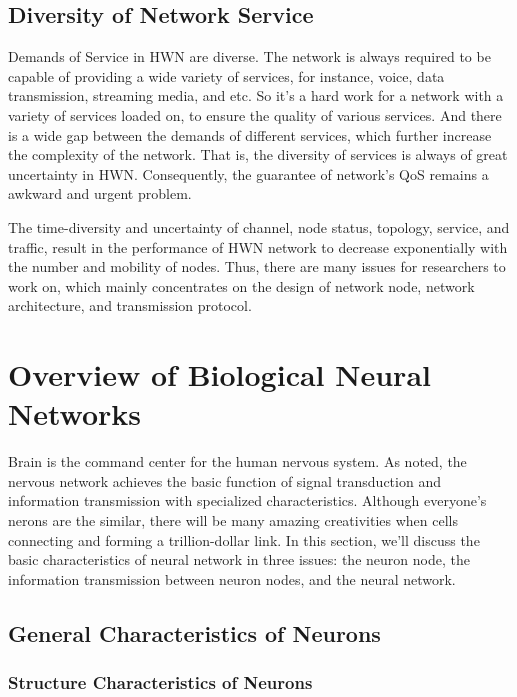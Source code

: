 \documentclass[journal,comsoc]{IEEEtran}
\begin{document}
			\subsection{Diversity of Network Service}
				Demands of Service in HWN are diverse. 
				The network is always required to be capable of providing a wide variety of services, for instance, voice, data transmission, streaming media, and etc.
				So it's a hard work for a network with a variety of services loaded on, to ensure the quality of various services.
				And there is a wide gap between the demands of different services, which further increase the complexity of the network.
				That is, the diversity of services is always of great uncertainty in HWN.
				Consequently, the guarantee of network's QoS remains a awkward and urgent problem.
				
				The time-diversity and uncertainty of channel, node status, topology, service, and traffic, 
				result in the performance of HWN network to decrease exponentially with the number and mobility of nodes.
				Thus, there are many issues for researchers to work on, 
				which mainly concentrates on the design of network node, network architecture, and transmission protocol.
		
	\section{Overview of Biological Neural Networks}
	\label{section: information_transmit}
		Brain is the command center for the human nervous system\cite{hart1983human}.
		As \cite{rsheng} noted, the nervous network achieves the basic function of signal transduction and information transmission with specialized characteristics.
		Although everyone's nerons are the similar, there will be many amazing creativities when cells connecting and forming a trillion-dollar link.
		In this section, we'll discuss the basic characteristics of neural network in three issues: 
		the neuron node, the  information transmission between neuron nodes, and the neural network.

		\subsection{General Characteristics of Neurons}
			\subsubsection{Structure Characteristics of Neurons}
\end{document}
